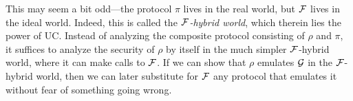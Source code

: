 This may seem a bit odd---the protocol $\pi$ lives in the real world, but $\mathcal{{F}}$
lives in the ideal world. Indeed, this is called the \emph{$\mathcal{{F}}$-hybrid
  world}, which therein lies the power of UC. Instead of analyzing the composite
protocol consisting of $\rho$ and $\pi$, it suffices to analyze the security of $\rho$
by itself in the much simpler $\mathcal{{F}}$-hybrid world, where it can make calls to
$\mathcal{{F}}$. If we can show that $\rho$ emulates $\mathcal{{G}}$ in the $\mathcal{{F}}$-hybrid
world, then we can later substitute for $\mathcal{{F}}$ any protocol that emulates it
without fear of something going wrong.

